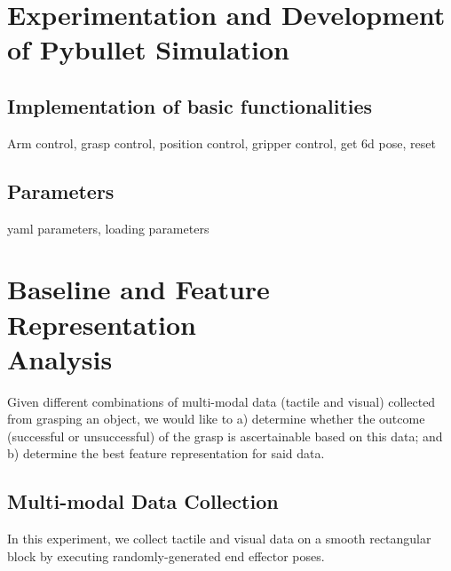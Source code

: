 \documentclass[12pt, a4paper]{report}
\theoremstyle{definition}
\begin{document}
\chapter{Experimentation and Development of Pybullet Simulation}
\label{chap:3}

\section{Implementation of basic functionalities}
Arm control, grasp control, position control, gripper control, get 6d pose, reset

\section{Parameters}
yaml parameters, loading parameters


\chapter{Baseline and Feature Representation \\ Analysis}
\label{chap:4}
Given different combinations of multi-modal data (tactile and visual) collected from grasping an object, we would like to a) determine whether the outcome (successful or unsuccessful) of the grasp is ascertainable based on this data; and b) determine the best feature representation for said data.

\section{Multi-modal Data Collection}
\label{sec:4.1}
In this experiment, we collect tactile and visual data on a smooth rectangular block by executing randomly-generated end effector poses.
\end{document}
